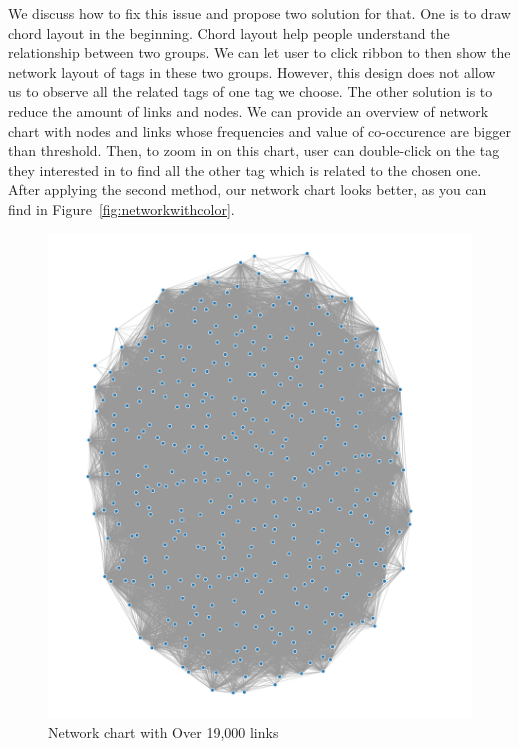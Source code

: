 \documentclass{report}
\numberwithin{figure}{section}
\begin{document}
\quad We discuss how to fix this issue and propose two solution for that. One is to draw chord layout in the beginning. Chord layout help people understand the relationship between two groups. We can let user to click ribbon to then show the network layout of tags in these two groups. However, this design does not allow us to observe all the related tags of one tag we choose. The other solution is to reduce the amount of links and nodes. We can provide an overview of network chart with nodes and links whose frequencies and value of co-occurence are bigger than threshold. Then, to zoom in on this chart, user can double-click on the tag they interested in to find all the other tag which is related to the chosen one. After applying the second method, our network chart looks better, as you can find in Figure~\ref{fig:networkwithcolor}.
\begin{figure}
\begin{center}
\includegraphics[scale=0.3]{Crazylink}
\caption{Network chart with Over 19,000 links}
\label{fig:networkball}
\end{center}
\end{figure}
\end{document}
